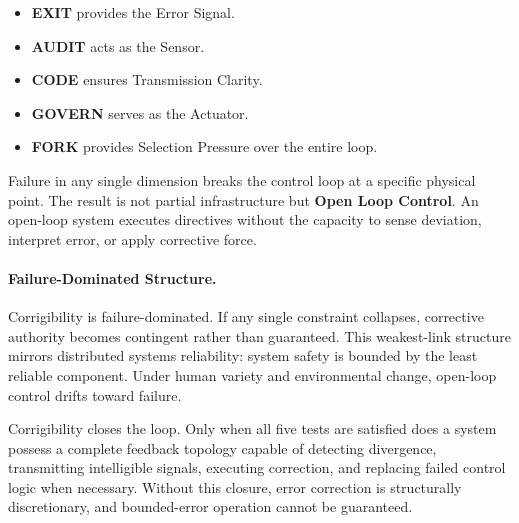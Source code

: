 \documentclass{article}
\begin{document}
\begin{itemize}[noitemsep,topsep=0pt]
    \item \textbf{EXIT} provides the Error Signal.
    \item \textbf{AUDIT} acts as the Sensor.
    \item \textbf{CODE} ensures Transmission Clarity.
    \item \textbf{GOVERN} serves as the Actuator.
    \item \textbf{FORK} provides Selection Pressure over the entire loop.
\end{itemize}

Failure in any single dimension breaks the control loop at a specific physical point. The result is not partial infrastructure but \textbf{Open Loop Control}. An open-loop system executes directives without the capacity to sense deviation, interpret error, or apply corrective force.

\paragraph{Failure-Dominated Structure.} Corrigibility is failure-dominated. If any single constraint collapses, corrective authority becomes contingent rather than guaranteed. This weakest-link structure mirrors distributed systems reliability: system safety is bounded by the least reliable component. Under human variety and environmental change, open-loop control drifts toward failure.

Corrigibility closes the loop. Only when all five tests are satisfied does a system possess a complete feedback topology capable of detecting divergence, transmitting intelligible signals, executing correction, and replacing failed control logic when necessary. Without this closure, error correction is structurally discretionary, and bounded-error operation cannot be guaranteed.
\end{document}
